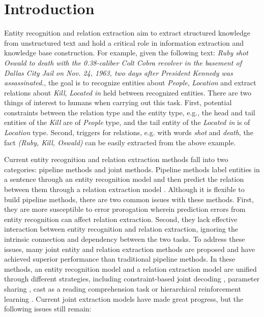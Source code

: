 \documentclass[sigconf]{acmart}
\begin{document}









\maketitle

\section{Introduction}
Entity recognition and relation extraction aim to extract structured knowledge from unstructured text and hold a critical role in information extraction and knowledge base construction. For example, given the following text: \textit{ Ruby shot Oswald to death with the 0.38-caliber Colt Cobra revolver in the basement of Dallas City Jail on Nov. 24, 1963, two days after President Kennedy was assassinated.}, the goal is to recognize entities about \textit{ People}, \textit{ Location} and extract relations about \textit{ Kill}, \textit{Located in}  held between recognized entities. There are two things of interest to humans when carrying out this task. First, potential constraints between the relation type and the entity type, e.g., the head and tail entities of the \textit{Kill} are of \textit{People} type, and the tail entity of the \textit{Located in} is of \textit{Location} type. Second, triggers for relations, e.g. with words \textit{shot} and \textit{death}, the fact \textit{(Ruby, Kill, Oswald)} can be easily extracted from the above example.

Current entity recognition and relation extraction methods fall into two categories: pipeline methods and joint methods. Pipeline methods label entities in a sentence through an entity recognition model and then predict the relation between them through a relation extraction model \cite{chan2011exploiting, lin2016neural}. Although it is flexible to build pipeline methods, there are two common issues with these methods. First, they are more susceptible to error prorogation wherein prediction errors from entity recognition can affect relation extraction. Second, they lack effective interaction between entity recognition and relation extraction, ignoring the intrinsic connection and dependency between the two tasks. To address these issues, many joint entity and relation extraction methods are proposed and have achieved superior performance than traditional pipeline methods. In these methods, an entity recognition model and a relation extraction model are unified through different strategies, including constraint-based joint decoding \cite{li2014incremental,wang2018joint}, parameter sharing \cite{bekoulis2018joint,luan2018multi,eberts2019span}, cast as a reading comprehension task \cite{li2019entity, zhaoasking} or hierarchical reinforcement learning \cite{takanobu2019hierarchical}. Current joint extraction models have made great progress, but the following issues still remain:
\end{document}

